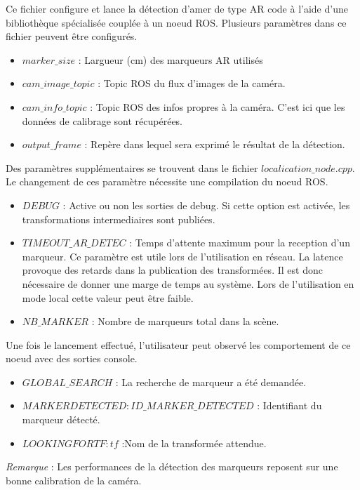 \documentclass[10pt,a4paper]{article}
\begin{document}
Ce fichier configure et lance la détection d'amer de type AR code à l'aide d'une bibliothèque spécialisée couplée à un noeud ROS. 
Plusieurs paramètres dans ce fichier peuvent être configurés.
\begin{itemize}
\item $marker\_size$ : Largueur (cm) des marqueurs AR utilisés
\item $cam\_image\_topic$ : Topic ROS du flux d'images de la caméra.
\item $cam\_info\_topic$ : Topic ROS des infos propres à la caméra. C'est ici que les données de calibrage sont récupérées.
\item $output\_frame$ : Repère dans lequel sera exprimé le résultat de la détection.\\
\end{itemize}
Des paramètres supplémentaires se trouvent dans le fichier $localication\_node.cpp$. Le changement de ces paramètre nécessite une compilation du noeud ROS.
\begin{itemize}
\item $DEBUG$ : Active ou non les sorties de debug. Si cette option est activée, les transformations intermediaires sont publiées.
\item $TIMEOUT\_AR\_DETEC$ : Temps d'attente maximum pour la reception d'un marqueur. Ce paramètre est utile lors de l'utilisation en réseau. La latence provoque des retards dans la publication des transformées. Il est donc nécessaire de donner une marge de temps au système. Lors de l'utilisation en mode local cette valeur peut \^etre faible.
\item $NB\_MARKER$ : Nombre de marqueurs total dans la scène.\\
\end{itemize}

Une fois le lancement effectué, l'utilisateur peut observé les comportement de ce noeud avec des sorties console.
\begin{itemize}
\item $GLOBAL\_SEARCH$ : La recherche de marqueur a été demandée.
\item $ MARKER DETECTED: ID\_MARKER\_DETECTED$ : Identifiant du marqueur détecté.
\item $LOOKING FOR TF: tf$ :Nom de la transformée attendue.\\
\end{itemize}

\textit{Remarque} : Les performances de la détection des marqueurs reposent sur une bonne calibration de la caméra.
\end{document}
